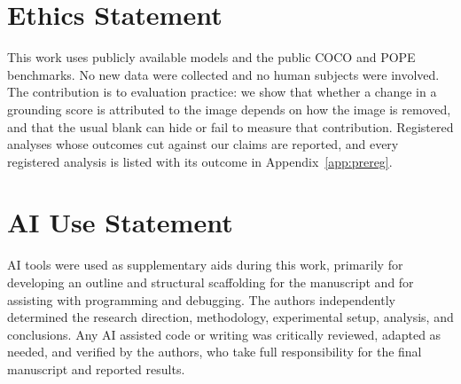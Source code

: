 \documentclass{article} %
\begin{document}
\section*{Ethics Statement}

This work uses publicly available models and the public COCO and POPE benchmarks. No new data were
collected and no human subjects were involved. The contribution is to evaluation practice: we show
that whether a change in a grounding score is attributed to the image depends on how the image is
removed, and that the usual blank can hide or fail to measure that contribution. Registered analyses
whose outcomes cut against our claims are reported, and every registered analysis is listed with its
outcome in Appendix~\ref{app:prereg}.

\section*{AI Use Statement}
AI tools were used as supplementary aids during this work, primarily for developing an outline and structural scaffolding for the manuscript and for assisting with programming and debugging. The authors independently determined the research direction, methodology, experimental setup, analysis, and conclusions. Any AI assisted code or writing was critically reviewed, adapted as needed, and verified by the authors, who take full responsibility for the final manuscript and reported results.




\appendix

\end{document}
